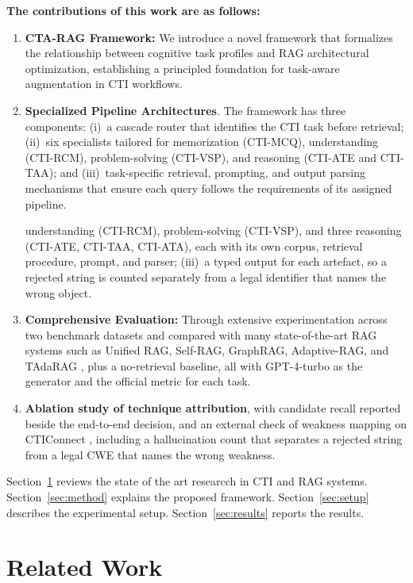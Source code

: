 \documentclass[5p,times,authoryear]{elsarticle}
\begin{document}
\noindent\textbf{The contributions of this work are as follows:}
\begin{enumerate}[leftmargin=*,nosep,topsep=2pt]
\item \textbf{CTA-RAG Framework:} We introduce a novel framework that formalizes the relationship between cognitive task profiles and RAG architectural optimization, establishing a principled foundation for task-aware augmentation in CTI workflows.
\item \textbf{Specialized Pipeline Architectures}. The framework has three components: (i)~a cascade router that identifies the CTI task before retrieval; (ii)~six specialists tailored for memorization (CTI-MCQ), understanding (CTI-RCM), problem-solving (CTI-VSP), and reasoning (CTI-ATE and CTI-TAA); and (iii)~task-specific retrieval, prompting, and output parsing mechanisms that ensure each query follows the requirements of its assigned pipeline.

understanding (CTI-RCM), problem-solving (CTI-VSP), and three reasoning (CTI-ATE, CTI-TAA, CTI-ATA), each with its own corpus, retrieval procedure, prompt, and parser; (iii)~a typed output for each artefact, so a rejected string is counted separately from a legal identifier that names the wrong object.
\item \textbf{Comprehensive Evaluation:} Through extensive experimentation across two benchmark datasets and compared with many state-of-the-art RAG systems such as Unified RAG, Self-RAG, GraphRAG, Adaptive-RAG, and TAdaRAG \citep{lewis2020rag,asai2023selfrag,edge2024graphrag,jeong2024adaptive,zhang2026tadarag}, plus a no-retrieval baseline, all with GPT-4-turbo as the generator and the official metric for each task.
\item \textbf{Ablation study of technique attribution}, with candidate recall reported beside the end-to-end decision, and an external check of weakness mapping on CTIConnect \citep{cheng2026cticonnect}, including a hallucination count that separates a rejected string from a legal CWE that names the wrong weakness.
\end{enumerate}

Section~\ref{sec:related} reviews the state of the art researcch in CTI and RAG systems. Section~\ref{sec:method} explains the proposed framework. Section~\ref{sec:setup} describes the experimental setup. Section~\ref{sec:results} reports the results.

\section{Related Work}\label{sec:related}
\end{document}
